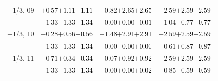 \documentclass[compress]{beamer}
\begin{document}
\begin{frame}
\begin{tabular}{r | c | c | c}
$-$1/3, 09 & $+0.57$\hspace{0.1 cm}$+1.11$\hspace{0.1 cm}\textcolor{black}{$+1.11$} & $+0.82$\hspace{0.1 cm}$+2.65$\hspace{0.1 cm}\textcolor{black}{$+2.65$} & $+2.59$\hspace{0.1 cm}$+2.59$\hspace{0.1 cm}\textcolor{black}{$+2.59$} \\
           & $-1.33$\hspace{0.1 cm}$-1.33$\hspace{0.1 cm}\textcolor{black}{$-1.34$} & $+0.00$\hspace{0.1 cm}$+0.00$\hspace{0.1 cm}\textcolor{black}{$-0.01$} & $-1.04$\hspace{0.1 cm}$-0.77$\hspace{0.1 cm}\textcolor{black}{$-0.77$} \\
$-$1/3, 10 & $-0.28$\hspace{0.1 cm}$+0.56$\hspace{0.1 cm}\textcolor{black}{$+0.56$} & $+1.48$\hspace{0.1 cm}$+2.91$\hspace{0.1 cm}\textcolor{black}{$+2.91$} & $+2.59$\hspace{0.1 cm}$+2.59$\hspace{0.1 cm}\textcolor{black}{$+2.59$} \\
           & $-1.33$\hspace{0.1 cm}$-1.33$\hspace{0.1 cm}\textcolor{black}{$-1.34$} & $-0.00$\hspace{0.1 cm}$-0.00$\hspace{0.1 cm}\textcolor{black}{$+0.00$} & $+0.61$\hspace{0.1 cm}$+0.87$\hspace{0.1 cm}\textcolor{black}{$+0.87$} \\
$-$1/3, 11 & $-0.71$\hspace{0.1 cm}$+0.34$\hspace{0.1 cm}\textcolor{black}{$+0.34$} & $-0.07$\hspace{0.1 cm}$+0.92$\hspace{0.1 cm}\textcolor{black}{$+0.92$} & $+2.59$\hspace{0.1 cm}$+2.59$\hspace{0.1 cm}\textcolor{black}{$+2.59$} \\
           & $-1.33$\hspace{0.1 cm}$-1.33$\hspace{0.1 cm}\textcolor{black}{$-1.34$} & $+0.00$\hspace{0.1 cm}$+0.00$\hspace{0.1 cm}\textcolor{black}{$+0.02$} & $-0.85$\hspace{0.1 cm}$-0.59$\hspace{0.1 cm}\textcolor{black}{$-0.59$} \\

\end{tabular}
\end{frame}
\end{document}
